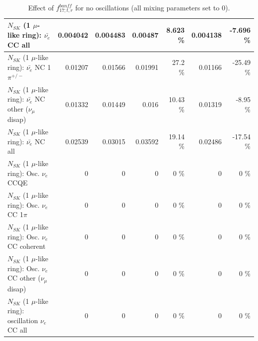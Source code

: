 \begin{table}
\begin{tabular}{| l | r | r | r  r | r  r |}
                            $N_{SK}$ (1 $\mu$-like ring): $\bar{\nu_{e}}$ CC all &        0.004042 &        0.004483 &         0.00487 &    8.623 \%  &        0.004138 &   -7.696 \%  \\ 
\hline
                     $N_{SK}$ (1 $\mu$-like ring): $\bar{\nu_e}$ NC 1$\pi^{+/-}$ &         0.01207 &         0.01566 &         0.01991 &     27.2 \%  &         0.01166 &   -25.49 \%  \\ 
          $N_{SK}$ (1 $\mu$-like ring): $\bar{\nu_e}$ NC other ($\nu_\mu$ disap) &         0.01332 &         0.01449 &           0.016 &    10.43 \%  &         0.01319 &    -8.95 \%  \\ 
                            $N_{SK}$ (1 $\mu$-like ring): $\bar{\nu_{e}}$ NC all &         0.02539 &         0.03015 &         0.03592 &    19.14 \%  &         0.02486 &   -17.54 \%  \\ 
\hline
\hline
\hline
                                 $N_{SK}$ (1 $\mu$-like ring): Osc. $\nu_e$ CCQE &               0 &               0 &               0 &        0 \%  &               0 &        0 \%  \\ 
                            $N_{SK}$ (1 $\mu$-like ring): Osc. $\nu_e$ CC 1$\pi$ &               0 &               0 &               0 &        0 \%  &               0 &        0 \%  \\ 
                          $N_{SK}$ (1 $\mu$-like ring): Osc. $\nu_e$ CC coherent &               0 &               0 &               0 &        0 \%  &               0 &        0 \%  \\ 
           $N_{SK}$ (1 $\mu$-like ring): Osc. $\nu_e$ CC other ($\nu_\mu$ disap) &               0 &               0 &               0 &        0 \%  &               0 &        0 \%  \\ 
                        $N_{SK}$ (1 $\mu$-like ring): oscillation $\nu_e$ CC all &               0 &               0 &               0 &        0 \%  &               0 &        0 \%  \\ 
\hline
\hline
\end{tabular}
\caption{ Effect of $f_{17; t, r}^{banff}$ for no oscillations (all mixing parameters set to 0). }
\label{tab:num_banff_mares_1RmuT_3f_osc_t13:0}
\end{table}
\clearpage
